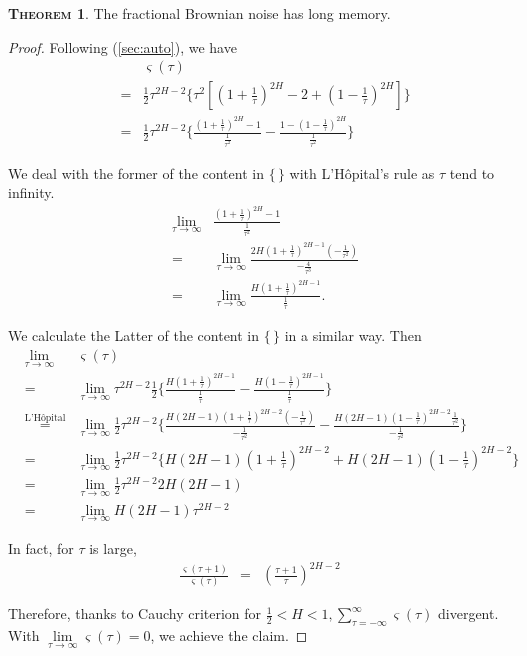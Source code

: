 \documentclass[a4paper, twoside, 11pt]{article}
\theoremstyle{definition}
\newtheorem{theorem}[definition]{\scshape Theorem}
\begin{document}
\begin{theorem}
  The fractional Brownian noise has long memory.
  \label{sec:lmemory}
\end{theorem}
\begin{proof}
  Following (\ref{sec:auto}), we have
  \begin{eqnarray*}
  &&\varsigma(\tau) \\
  &=& \frac{1}{2} \tau^{2H-2}\{ \tau^2[(1+\frac{1}{\tau})^{2H} - 2 + (1-\frac{1}{\tau})^{2H}] \} \\
  &=& \frac{1}{2} \tau^{2H-2}\{ \frac{(1+\frac{1}{\tau})^{2H} - 1 } {\frac{1}{\tau^2}} -  \frac{1 - (1-\frac{1}{\tau})^{2H}} {\frac{1}{\tau^2}} \}
\end{eqnarray*}

We deal with the former of the content in $\{\,\}$ with L'H\^opital's rule as $\tau$ tend to infinity.
\begin{eqnarray*}
&\lim\limits_{\tau\rightarrow\infty}&\frac{(1+\frac{1}{\tau})^{2H} - 1 } {\frac{1}{\tau^2}}\\
&=& \lim\limits_{\tau\rightarrow\infty} \frac{2H(1+\frac{1}{\tau})^{2H-1}(-\frac{1}{\tau^2})}{-\frac{4}{\tau^3}} \\
&=&   \lim\limits_{\tau\rightarrow\infty}\frac{H(1+\frac{1}{\tau})^{2H-1}}{\frac{1}{\tau}}.
\end{eqnarray*}

We calculate the Latter of the content in $\{\,\}$ in a similar way. Then
\begin{eqnarray*}
&\lim\limits_{\tau\rightarrow\infty}&\varsigma(\tau)\\
&=&\lim\limits_{\tau\rightarrow\infty} \tau^{2H-2} \frac{1}{2}\{ \frac{H(1 +\frac{1}{\tau})^{2H-1}}{\frac{1}{\tau}} - \frac{H(1-\frac{1}{\tau})^{2H-1}}{\frac{1}{\tau}}\}\\
&\overset{\text{L'H\^opital}}{=}&\lim\limits_{\tau\rightarrow\infty}  \frac{1}{2} \tau^{2H-2}\{\frac{H(2H-1)(1+\frac{1}{\tau})^{2H-2}(-\frac{1}{\tau^2})}{-\frac{1}{\tau^2}} - \frac{H(2H-1)(1-\frac{1}{\tau})^{2H-2}\frac{1}{\tau^2}}{-\frac{1}{\tau^2}}\}\\
&=& \lim\limits_{\tau\rightarrow\infty} \frac{1}{2} \tau^{2H-2}\{H(2H-1)(1+\frac{1}{\tau})^{2H-2} + H(2H-1)(1-\frac{1}{\tau})^{2H-2}\}\\
&=& \lim\limits_{\tau\rightarrow\infty}\frac{1}{2} \tau^{2H-2} 2H(2H-1)\\
&=& \lim\limits_{\tau\rightarrow\infty} H(2H-1) \tau^{2H-2}
\end{eqnarray*}


In fact, for $\tau$ is large,
\begin{eqnarray*}
  \frac{\varsigma(\tau+1)}{\varsigma(\tau)} &=& (\frac{\tau+1}{\tau})^{2H-2}
\end{eqnarray*}

Therefore, thanks to Cauchy criterion for $\frac{1}{2} < H < 1, \sum\limits_{\tau=-\infty}^{\infty} \varsigma(\tau) $ divergent. With $\lim\limits_{\tau\rightarrow \infty}\varsigma(\tau)=0$, we achieve the claim. 
\end{proof}
\end{document}
